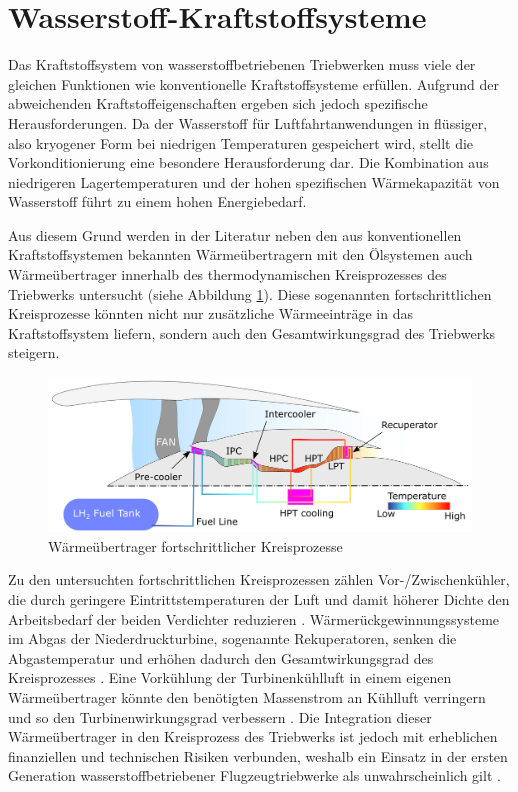 \section{Wasserstoff-Kraftstoffsysteme}

Das Kraftstoffsystem von wasserstoffbetriebenen Triebwerken muss viele der gleichen Funktionen wie konventionelle Kraftstoffsysteme erfüllen. Aufgrund der abweichenden Kraftstoffeigenschaften ergeben sich jedoch spezifische Herausforderungen. Da der Wasserstoff für Luftfahrtanwendungen in flüssiger, also kryogener Form bei niedrigen Temperaturen gespeichert wird, stellt die Vorkonditionierung eine besondere Herausforderung dar. Die Kombination aus niedrigeren Lagertemperaturen und der hohen spezifischen Wärmekapazität von Wasserstoff führt zu einem hohen Energiebedarf. \cite{Rompokos.2024, Sethi.2022}

Aus diesem Grund werden in der Literatur neben den aus konventionellen Kraftstoffsystemen bekannten Wärmeübertragern mit den Ölsystemen auch Wärmeübertrager innerhalb des thermodynamischen Kreisprozesses des Triebwerks untersucht (siehe Abbildung \ref{fig:2.2}). Diese sogenannten fortschrittlichen Kreisprozesse könnten nicht nur zusätzliche Wärmeeinträge in das Kraftstoffsystem liefern, sondern auch den Gesamtwirkungsgrad des Triebwerks steigern.

\begin{figure}[ht]
\centering
\includegraphics[width=0.75\linewidth]{4_Abbildungen/2_Hauptteil/Advanced Cycles.png}
  \caption{Wärmeübertrager fortschrittlicher Kreisprozesse \cite{Sethi.2022}}
  \label{fig:2.2}
\end{figure}
\FloatBarrier 

Zu den untersuchten fortschrittlichen Kreisprozessen zählen Vor-/Zwischenkühler, die durch geringere Eintrittstemperaturen der Luft und damit höherer Dichte den Arbeitsbedarf der beiden Verdichter reduzieren \cite{Abedi.2022}. Wärmerückgewinnungssysteme im Abgas der Niederdruckturbine, sogenannte Rekuperatoren, senken die Abgastemperatur und erhöhen dadurch den Gesamtwirkungsgrad des Kreisprozesses \cite{Brewer.1991}. Eine Vorkühlung der Turbinenkühlluft in einem eigenen Wärmeübertrager könnte den benötigten Massenstrom an Kühlluft verringern und so den Turbinenwirkungsgrad verbessern \cite{Brewer.1991}. Die Integration dieser Wärmeübertrager in den Kreisprozess des Triebwerks ist jedoch mit erheblichen finanziellen und technischen Risiken verbunden, weshalb ein Einsatz in der ersten Generation wasserstoffbetriebener Flugzeugtriebwerke als unwahrscheinlich gilt \cite{Rompokos.2024, Huete.2021}. 

